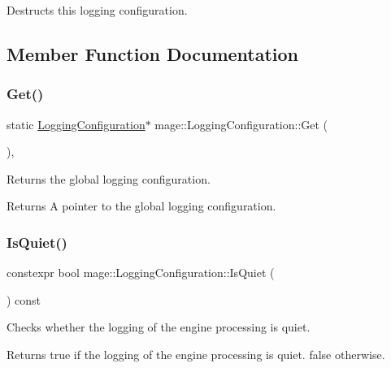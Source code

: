 Destructs this logging configuration. 

\subsection{Member Function Documentation}
\hypertarget{classmage_1_1_logging_configuration_a9a2b9343e49bd5befe10cf06225e5c83}{}\label{classmage_1_1_logging_configuration_a9a2b9343e49bd5befe10cf06225e5c83} 
\subsubsection{\texorpdfstring{Get()}{Get()}}
{\footnotesize\ttfamily static \hyperlink{classmage_1_1_logging_configuration}{Logging\+Configuration}$\ast$ mage\+::\+Logging\+Configuration\+::\+Get (\begin{DoxyParamCaption}{ }\end{DoxyParamCaption})\hspace{0.3cm}{\ttfamily [static]}, {\ttfamily [noexcept]}}

Returns the global logging configuration.

\begin{DoxyReturn}{Returns}
A pointer to the global logging configuration. 
\end{DoxyReturn}
\hypertarget{classmage_1_1_logging_configuration_a1096a1ef5f9237fb76fc5937ac1a1210}{}\label{classmage_1_1_logging_configuration_a1096a1ef5f9237fb76fc5937ac1a1210} 
\subsubsection{\texorpdfstring{Is\+Quiet()}{IsQuiet()}}
{\footnotesize\ttfamily constexpr bool mage\+::\+Logging\+Configuration\+::\+Is\+Quiet (\begin{DoxyParamCaption}{ }\end{DoxyParamCaption}) const\hspace{0.3cm}{\ttfamily [noexcept]}}

Checks whether the logging of the engine processing is quiet.

\begin{DoxyReturn}{Returns}
{\ttfamily true} if the logging of the engine processing is quiet. {\ttfamily false} otherwise. 
\end{DoxyReturn}
\hypertarget{classmage_1_1_logging_configuration_abd81834c6938be1b32a7bd6eb08d5242}{}\label{classmage_1_1_logging_configuration_abd81834c6938be1b32a7bd6eb08d5242} 

